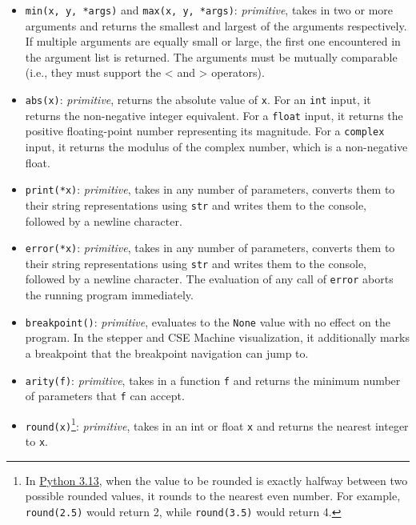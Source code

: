 \begin{itemize}
  \item
    \verb#min#\texttt{(x, y, *args)} and \verb#max#\texttt{(x, y, *args)}: \textit{primitive}, 
    takes in two or more arguments and returns the smallest and largest of the arguments respectively. 
    If multiple arguments are equally small or large, the first one encountered in the argument list is returned. 
    The arguments must be mutually comparable (i.e., they must support the < and > operators).

  \item
    \verb#abs#\texttt{(x)}: \textit{primitive}, returns the absolute value of \texttt{x}.
    For an \verb#int# input, it returns the non-negative integer equivalent. 
    For a \verb#float# input, it returns the positive floating-point number representing its magnitude.
    For a \verb#complex# input, it returns the modulus of the complex number, which is a non-negative float.

  \item
    \verb#print#\texttt{(*x)}: \textit{primitive}, takes in any number of parameters, converts them to their string
    representations using \verb#str# and writes them to the console, followed by a newline character.

  \item
    \verb#error#\texttt{(*x)}: \textit{primitive}, takes in any number of parameters, converts them to their string
    representations using \verb#str# and writes them to the console, followed by a newline character.
    The evaluation of any call of \texttt{error} aborts the running program immediately.

  \item
    \verb#breakpoint#\texttt{()}: \textit{primitive}, evaluates to the \texttt{None} value with no
    effect on the program. In the stepper and CSE Machine visualization,
    it additionally marks a breakpoint that the breakpoint navigation can jump to.
  \item
    \verb#arity#\texttt{(f)}: \textit{primitive},
    takes in a function \texttt{f} and returns the minimum number of parameters that \texttt{f} can accept.

  \item
    \verb#round#\texttt{(x)}\footnote{
      In \href{https://docs.python.org/3.13/library/functions.html\#round}{Python 3.13},
      when the value to be rounded is exactly halfway between two possible rounded values, it rounds to the nearest even number. For example, \texttt{round(2.5)} would return 2, while \texttt{round(3.5)} would return 4.
    }: \textit{primitive}, 
    takes in an int or float \texttt{x} and returns the nearest integer to \texttt{x}.


\end{itemize}

